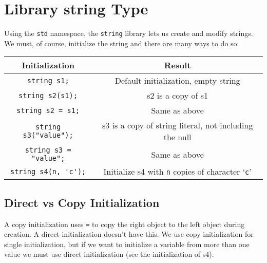 \documentclass[12pt, a4paper]{report}
\begin{document}
\section{Library string Type}
Using the \verb|std| namespace, the \verb|string| library lets us create and modify strings. We must, of course, initialize the string and there are many ways to do so:
\begin{center}
  \begin{tabular}{ |c|c| }
    \hline
    \textbf{Initialization} & \textbf{Result} \\
    \hline
    \verb|string s1;| & Default initialization, empty string \\
    \hline
    \verb|string s2(s1);| & s2 is a copy of s1 \\
    \hline
    \verb|string s2 = s1;| & Same as above \\
    \hline
    \verb|string s3("value");| & s3 is a copy of string literal, not including the null \\
    \hline
    \verb|string s3 = "value";| & Same as above \\
    \hline
    \verb|string s4(n, 'c');| & Initialize s4 with \verb|n| copies of character `\verb|c|' \\
    \hline
  \end{tabular}
\end{center}
\subsection{Direct vs Copy Initialization}
A copy initialization uses \verb|=| to copy the right object to the left object during creation. A direct initialization doesn't have this.
We use copy initialization for single initialization, but if we want to initialize a variable from more than one value we must use direct initialization
(see the initialization of s4).
\end{document}
